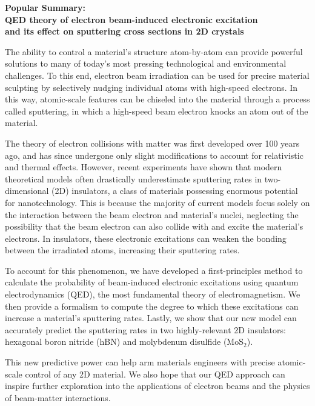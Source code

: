 \documentclass{article}
\begin{document}
\begin{center}
  \large{\textbf{
    Popular Summary: \\
    QED theory of electron beam-induced electronic excitation \\
    and its effect on sputtering cross sections in 2D crystals
}}
\end{center}

The ability to control a material's structure atom-by-atom can provide
powerful solutions to many of today's most pressing technological and
environmental challenges.
To this end, electron beam irradiation can be used for precise material
sculpting by selectively nudging individual atoms with high-speed electrons.
In this way, atomic-scale features can be chiseled into the material through a
process called sputtering, in which a high-speed beam electron knocks an atom
out of the material.

The theory of electron collisions with matter was first developed over 100
years ago, and has since undergone only slight modifications to account for
relativistic and thermal effects.
However, recent experiments have shown that modern theoretical models often
drastically underestimate sputtering rates in two-dimensional (2D) insulators,
a class of materials possessing enormous potential for nanotechnology.
This is because the majority of current models focus solely on the interaction
between the beam electron and material's nuclei, neglecting the possibility that
the beam electron can also collide with and excite the material's electrons.
In insulators, these electronic excitations can weaken the bonding between the
irradiated atoms, increasing their sputtering rates.

To account for this phenomenon, we have developed a first-principles method to
calculate the probability of beam-induced electronic excitations using quantum
electrodynamics (QED), the most fundamental theory of electromagnetism.
We then provide a formalism to compute the degree to which these excitations
can increase a material's sputtering rates.
Lastly, we show that our new model can accurately predict the sputtering rates
in two highly-relevant 2D insulators: hexagonal boron nitride (hBN) and
molybdenum disulfide (MoS$_2$).

This new predictive power can help arm materials engineers with precise
atomic-scale control of any 2D material.
We also hope that our QED approach can inspire further exploration into the
applications of electron beams and the physics of beam-matter interactions.
\end{document}
